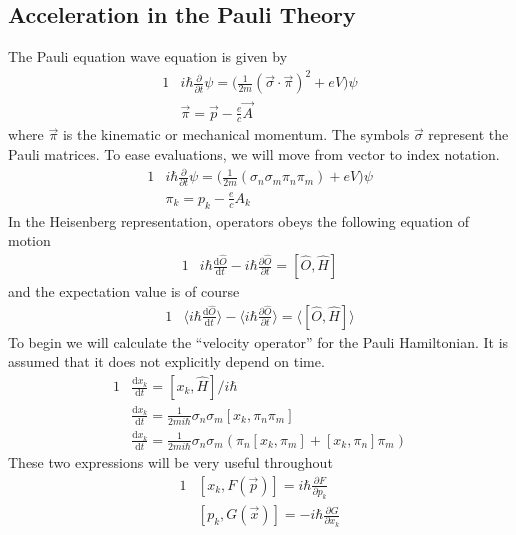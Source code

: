 \documentclass[]{article}
\numberwithin{equation}{subsection}
\begin{document}
\subsection{Acceleration in the Pauli Theory}
The Pauli equation wave equation is given by
\begin{alignat}{1}
  \label{m02}		&i\hbar\frac{\partial}{\partial t}\psi=\Big(\frac{1}{2m}(\vec{\sigma}\cdot\vec{\pi})^{2}+eV\Big)\psi\\
  \label{m03}		&\vec{\pi}=\vec{p}-\frac{e}{c}\vec{A}
\end{alignat}
where $\vec{\pi}$ is the kinematic or mechanical momentum. The symbols $\vec{\sigma}$ represent the Pauli matrices. To ease evaluations, we will move from vector to index notation.
\begin{alignat}{1}
  \label{m04}		&i\hbar\frac{\partial}{\partial t}\psi=\Big(\frac{1}{2m}(\sigma_{n}\sigma_{m}\pi_{n}\pi_{m})+eV\Big)\psi\\
  \label{m05}		&\pi_{k}=p_{k}-\frac{e}{c}A_{k}
\end{alignat}
In the Heisenberg representation, operators obeys the following equation of motion
\begin{alignat}{1}
  \label{m06}		&i\hbar\frac{\mathrm{d}\hat{O}}{\mathrm{d}t}-i\hbar\frac{\partial\hat{O}}{\partial t}=[\hat{O},\hat{H}]
\end{alignat}
and the expectation value is of course
\begin{alignat}{1}
  \label{m07}		&\langle i\hbar\frac{\mathrm{d}\hat{O}}{\mathrm{d}t}\rangle-\langle i\hbar\frac{\partial\hat{O}}{\partial t}\rangle=\langle[\hat{O},\hat{H}]\rangle
\end{alignat}
To begin we will calculate the ``velocity operator'' for the Pauli Hamiltonian. It is assumed that it does not explicitly depend on time.
\begin{alignat}{1}
  \label{m08}		&\frac{\mathrm{d}x_{k}}{\mathrm{d}t}=[x_{k},\hat{H}]/i\hbar\\
  \label{m09}		&\frac{\mathrm{d}x_{k}}{\mathrm{d}t}=\frac{1}{2mi\hbar}\sigma_{n}\sigma_{m}[x_{k},\pi_{n}\pi_{m}]\\
  \label{m10}		&\frac{\mathrm{d}x_{k}}{\mathrm{d}t}=\frac{1}{2mi\hbar}\sigma_{n}\sigma_{m}(\pi_{n}[x_{k},\pi_{m}]+[x_{k},\pi_{n}]\pi_{m})
\end{alignat}
These two expressions will be very useful throughout
\begin{alignat}{1}
  \label{m11}		&[x_{k},F(\vec{p})]=i\hbar\frac{\partial F}{\partial p_{k}}\\
  \label{m12}		&[p_{k},G(\vec{x})]=-i\hbar\frac{\partial G}{\partial x_{k}}
\end{alignat}
\end{document}

